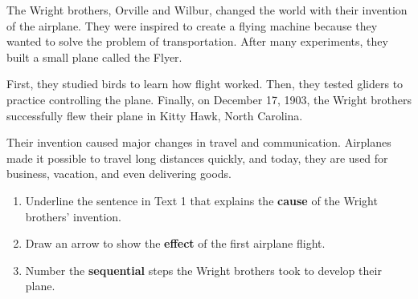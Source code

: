 \documentclass[12pt]{article}
\begin{document}
\begin{tcolorbox}[colframe=black!60, colback=white, 
coltitle=black, colbacktitle=black!15, fonttitle=\bfseries\Large, 
title=Text 3: The Wright Brothers and the First Flight, halign title=center, left=10pt, right=10pt, top=10pt, bottom=15pt]
The Wright brothers, Orville and Wilbur, changed the world with their invention of the airplane. They were inspired to create a flying machine because they wanted to solve the problem of transportation. After many experiments, they built a small plane called the Flyer.

First, they studied birds to learn how flight worked. Then, they tested gliders to practice controlling the plane. Finally, on December 17, 1903, the Wright brothers successfully flew their plane in Kitty Hawk, North Carolina. 

Their invention caused major changes in travel and communication. Airplanes made it possible to travel long distances quickly, and today, they are used for business, vacation, and even delivering goods.
\end{tcolorbox}

\vspace{1em}

\begin{tcolorbox}[colframe=black!60, colback=white, 
coltitle=black, colbacktitle=black!15, fonttitle=\bfseries\Large, 
title=Guided Practice, halign title=center, left=10pt, right=10pt, top=10pt, bottom=15pt]
\begin{enumerate}[itemsep=3em]
    \item Underline the sentence in Text 1 that explains the \textbf{cause} of the Wright brothers’ invention. 
    \item Draw an arrow to show the \textbf{effect} of the first airplane flight.
    \item Number the \textbf{sequential} steps the Wright brothers took to develop their plane.
\vspace{1em}

\end{enumerate}
\end{tcolorbox}

\vspace{1em}
\end{document}
